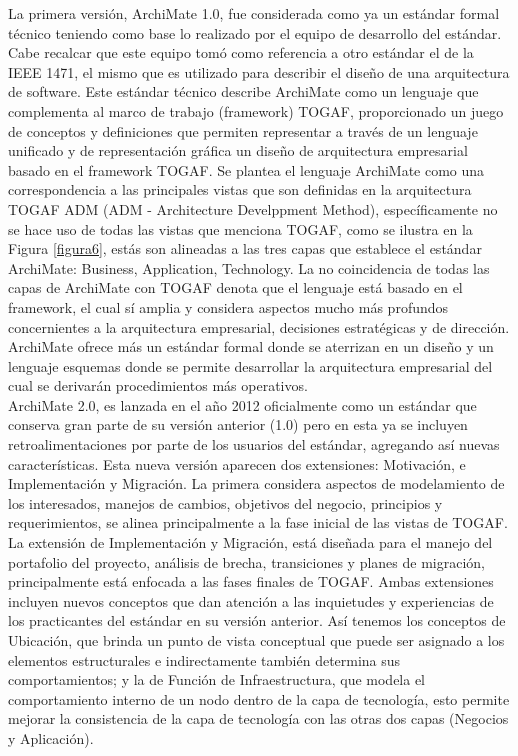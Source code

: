   La primera versión, ArchiMate 1.0, fue considerada como ya un estándar formal técnico teniendo como base lo realizado por el equipo de desarrollo del estándar. Cabe recalcar que este equipo tomó como referencia a otro estándar el de la IEEE 1471, el mismo que es utilizado para describir el diseño de una arquitectura de software. Este estándar técnico describe ArchiMate como un lenguaje que complementa al marco de trabajo (framework) TOGAF, proporcionado un juego de conceptos y definiciones que permiten representar a través de un lenguaje unificado y de representación gráfica un diseño de arquitectura empresarial basado en el framework TOGAF. Se plantea el lenguaje ArchiMate como una correspondencia a las principales vistas que son definidas en la arquitectura TOGAF ADM (ADM - Architecture Develppment Method), específicamente no se hace uso de todas las vistas que menciona TOGAF, como se ilustra en la Figura \ref{figura6}, estás son alineadas a las tres capas que establece el estándar ArchiMate: Business, Application, Technology. La no coincidencia de todas las capas de ArchiMate con TOGAF denota que el lenguaje está basado en el framework, el cual sí amplia y considera aspectos mucho más profundos concernientes a la arquitectura empresarial, decisiones estratégicas y de dirección. ArchiMate ofrece más un estándar formal donde se aterrizan en un diseño y un lenguaje esquemas donde se permite desarrollar la arquitectura empresarial del cual se derivarán procedimientos más operativos. \\
  
  ArchiMate 2.0, es lanzada en el año 2012 oficialmente como un estándar que conserva gran parte de su versión anterior (1.0) pero en esta ya se incluyen retroalimentaciones por parte de los usuarios del estándar, agregando así nuevas características. Esta nueva versión aparecen dos extensiones: Motivación, e Implementación y Migración. La primera considera aspectos de modelamiento de los interesados, manejos de cambios, objetivos del negocio, principios y requerimientos, se alinea principalmente a la fase inicial de las vistas de TOGAF. La extensión de Implementación y Migración, está diseñada para el manejo del portafolio del proyecto, análisis de brecha, transiciones y planes de migración, principalmente está enfocada a las fases finales de TOGAF. Ambas extensiones incluyen nuevos conceptos que dan atención a las inquietudes y experiencias de los practicantes del estándar en su versión anterior. Así tenemos los conceptos de Ubicación, que brinda un punto de vista conceptual que puede ser asignado a los elementos estructurales e indirectamente también determina sus comportamientos; y la de Función de Infraestructura, que modela el comportamiento interno de un nodo dentro de la capa de tecnología, esto permite mejorar la consistencia de la capa de tecnología con las otras dos capas (Negocios y Aplicación). \\
  
